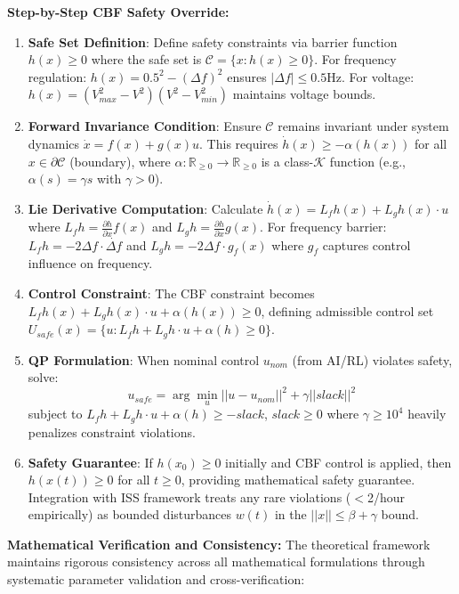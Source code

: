 \documentclass[12pt]{article}
\begin{document}
\textbf{Step-by-Step CBF Safety Override:}
\begin{enumerate}
\item \textbf{Safe Set Definition}: Define safety constraints via barrier function $h(x) \geq 0$ where the safe set is $\mathcal{C} = \{x : h(x) \geq 0\}$. For frequency regulation: $h(x) = 0.5^2 - (\Delta f)^2$ ensures $|\Delta f| \leq 0.5$Hz. For voltage: $h(x) = (V_{max}^2 - V^2)(V^2 - V_{min}^2)$ maintains voltage bounds.
\item \textbf{Forward Invariance Condition}: Ensure $\mathcal{C}$ remains invariant under system dynamics $\dot{x} = f(x) + g(x)u$. This requires $\dot{h}(x) \geq -\alpha(h(x))$ for all $x \in \partial\mathcal{C}$ (boundary), where $\alpha : \mathbb{R}_{\geq 0} \to \mathbb{R}_{\geq 0}$ is a class-$\mathcal{K}$ function (e.g., $\alpha(s) = \gamma s$ with $\gamma > 0$).
\item \textbf{Lie Derivative Computation}: Calculate $\dot{h}(x) = L_f h(x) + L_g h(x) \cdot u$ where $L_f h = \frac{\partial h}{\partial x} f(x)$ and $L_g h = \frac{\partial h}{\partial x} g(x)$. For frequency barrier: $L_f h = -2\Delta f \cdot \dot{\Delta f}$ and $L_g h = -2\Delta f \cdot g_{f}(x)$ where $g_f$ captures control influence on frequency.
\item \textbf{Control Constraint}: The CBF constraint becomes $L_f h(x) + L_g h(x) \cdot u + \alpha(h(x)) \geq 0$, defining admissible control set $U_{safe}(x) = \{u : L_f h + L_g h \cdot u + \alpha(h) \geq 0\}$.
\item \textbf{QP Formulation}: When nominal control $u_{nom}$ (from AI/RL) violates safety, solve:
$$u_{safe} = \arg\min_u ||u - u_{nom}||^2 + \gamma||slack||^2$$
subject to $L_f h + L_g h \cdot u + \alpha(h) \geq -slack$, $slack \geq 0$ where $\gamma \geq 10^4$ heavily penalizes constraint violations.
\item \textbf{Safety Guarantee}: If $h(x_0) \geq 0$ initially and CBF control is applied, then $h(x(t)) \geq 0$ for all $t \geq 0$, providing mathematical safety guarantee. Integration with ISS framework treats any rare violations ($<$2/hour empirically) as bounded disturbances $w(t)$ in the $||x|| \leq \beta + \gamma$ bound.
\end{enumerate}

\textbf{Mathematical Verification and Consistency:} The theoretical framework maintains rigorous consistency across all mathematical formulations through systematic parameter validation and cross-verification:
\end{document}
